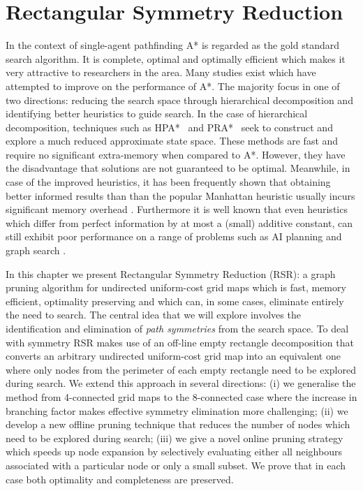 \chapter{Rectangular Symmetry Reduction}
\label{cha:rsr}
In the context of single-agent pathfinding A* \cite{hart68} is regarded as 
the gold standard search algorithm.
It is complete, optimal and optimally efficient which makes it very attractive 
to researchers in the area.
Many studies exist which have attempted to improve on the performance of A*.
The majority focus in one of two directions: reducing the search space through hierarchical 
decomposition and identifying better heuristics to guide search. 
In the case of hierarchical decomposition, techniques such as
HPA*~\cite{botea04} and PRA*~\cite{sturtevant05} seek to construct and explore
a much reduced approximate state space.
These methods are fast and require no significant extra-memory when compared to A*.
However, they have the disadvantage that solutions are not guaranteed to be optimal.
Meanwhile, in case of the improved heuristics, it has been frequently shown
that obtaining better informed results than than the popular
Manhattan heuristic usually incurs significant memory overhead 
\cite{sturtevant09,goldberg05,Cazenave:06,bjornsson06}.
Furthermore it is well known that even heuristics which differ from perfect information 
by at most a (small) additive constant, can still exhibit poor performance on a range of 
problems such as AI planning and graph search \cite{helmert08,pohl77}.

In this chapter we present Rectangular Symmetry Reduction (RSR): a graph pruning
algorithm for undirected uniform-cost grid maps which is fast, memory efficient,
optimality preserving and which can, in some cases, eliminate entirely the need
to search.  The central idea that we will explore involves the identification
and elimination of \emph{path symmetries} from the search space. 
To deal with symmetry RSR makes use of an off-line
empty rectangle decomposition \cite{harabor10} that converts an arbitrary
undirected uniform-cost grid map into an equivalent one where only nodes
from the perimeter of each empty rectangle need to be explored during search.
We extend this approach in several directions: (i) we generalise the method
from 4-connected grid maps to the 8-connected case where the increase in
branching factor makes effective symmetry elimination more challenging; (ii) we
develop a new offline pruning technique that reduces the number of nodes which
need to be explored during search; (iii) we give a novel online pruning strategy
which speeds up node expansion by selectively evaluating either all neighbours
associated with a particular node or only a small subset.  We prove that in each
case both optimality and completeness are preserved.




